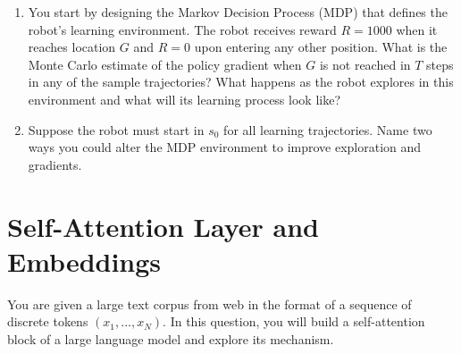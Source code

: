 \documentclass[11pt]{article}
\begin{document}
\begin{enumerate}[label=(\Alph*)]
    \item You start by designing the Markov Decision Process (MDP) that defines the robot's learning environment. The robot receives reward $R=1000$ when it reaches location $G$ and $R=0$ upon entering any other position. What is the Monte Carlo estimate of the policy gradient when $G$ is not reached in $T$ steps in any of the sample trajectories? What happens as the robot explores in this environment and what will its learning process look like?

    \item Suppose the robot must start in $s_0$ for all learning trajectories. Name two ways you could alter the MDP environment to improve exploration and gradients.
    

\end{enumerate}

\newpage

\section{Self-Attention Layer and Embeddings}

\noindent You are given a large text corpus from web in the format of a sequence of discrete tokens $(x_1, ..., x_N)$. 
In this question, you will build a self-attention block of a large language model and explore its mechanism. 
\end{document}
